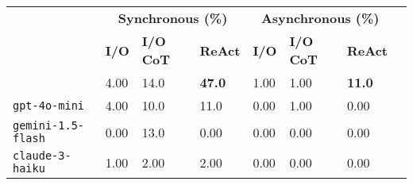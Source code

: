 \begin{table}[!h]
    \small
    \centering
    \begin{tabular}{llllllll}
        \toprule
        & \multicolumn{3}{c}{\textbf{Synchronous (\%)}} & \multicolumn{3}{c}{\textbf{Asynchronous (\%)}} \\ 
        \cmidrule(r){2-4} \cmidrule(r){5-7}
        & \textbf{I/O} & \textbf{I/O CoT} & \textbf{ReAct} & \textbf{I/O} & \textbf{I/O CoT} & \textbf{ReAct} \\ 
        \midrule
        \gptfo{} & 4.00 & 14.0 & \textbf{47.0} & 1.00 & 1.00 & \textbf{11.0}       \\
        \texttt{gpt-4o-mini} & 4.00 & 10.0 & 11.0 & 0.00    & 1.00 & 0.00     \\
        \texttt{gemini-1.5-flash} & 0.00 & 13.0 & 0.00 & 0.00 & 0.00 & 0.00      \\
        \texttt{claude-3-haiku} & 1.00 & 2.00 & 2.00 & 0.00 & 0.00 & 0.00      \\

\end{tabular}
\end{table}
